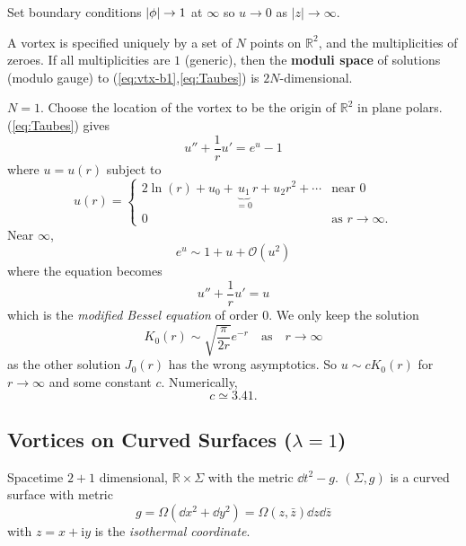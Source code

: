 \documentclass[a4paper,11pt]{article}
\begin{document}
    Set boundary conditions $\abs{\phi}\to 1$ at $\infty$ so $u \to 0$ as $|z| \to \infty$.

    \begin{thm}[Taubes]
        A vortex is specified uniquely by a set of $N$ points on $\mathbb{R}^2$, and the multiplicities of zeroes. If all multiplicities are $1$ (generic), then the \textbf{moduli space} of solutions (modulo gauge) to (\ref{eq:vtx-b1},\ref{eq:Taubes}) is $2N$-dimensional.
    \end{thm}

    \begin{ex}
        $N=1$. Choose the location of the vortex to be the origin of $\mathbb{R}^2$ in plane polars. (\ref{eq:Taubes}) gives 
        \begin{equation}
            u'' + \frac{1}{r} u' = e^u - 1
        \end{equation}
        where $u = u(r)$ subject to 
        \begin{equation}
            u(r) = \begin{cases}
                2 \ln(r) + u_0 + \underbrace{u_1}_{=0} r + u_2 r^2 + \cdots & \text{near }0\\
                0 & \text{as }r \to \infty.
            \end{cases}
        \end{equation}
        Near $\infty$, 
        \begin{equation}
            e^u \sim 1 + u + \mathcal{O}(u^2)
        \end{equation}
        where the equation becomes 
        \begin{equation}
            u'' + \frac{1}{r} u' = u
        \end{equation}
        which is the \emph{modified Bessel equation} of order 0. We only keep the solution 
        \begin{equation}
            K_0(r) \sim \sqrt{\frac{\pi}{2 r}} e^{-r} \quad \text{as} \quad r\to \infty 
        \end{equation}
        as the other solution $J_0(r)$ has the wrong asymptotics. So $u \sim c K_0(r)$ for $r \to \infty$ and some constant $c$. Numerically, 
        \begin{equation}
            c \simeq 3.41.
        \end{equation}
    \end{ex}

    \subsection{Vortices on Curved Surfaces ($\lambda = 1$)}
    Spacetime $2+1$ dimensional, $\mathbb{R} \times \Sigma$ with the metric $\dd{t^2} - g$. $(\Sigma, g)$ is a curved surface with metric 
    \begin{equation}
        g = \Omega \left( \dd{x^2} + \dd{y^2} \right) = \Omega(z,\bar z) \dd{z} \dd{\bar z}
    \end{equation}
    with $z = x+\mathrm{i} y$ is the \emph{isothermal coordinate}. 
\end{document}
